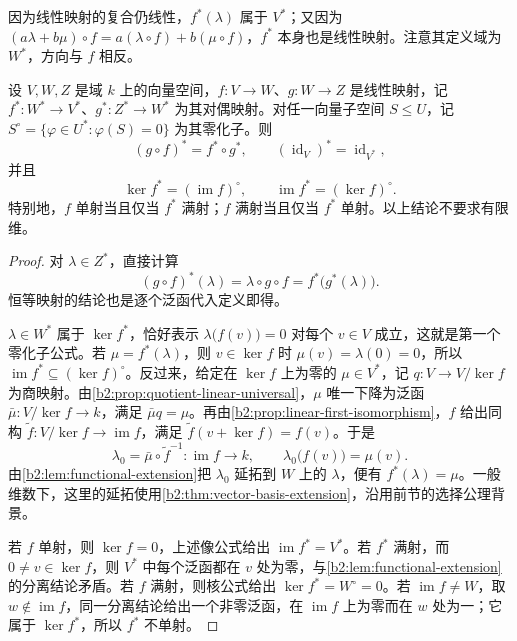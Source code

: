 因为线性映射的复合仍线性，\(f^*(\lambda)\) 属于 \(V^*\)；又因为 \((a\lambda+b\mu)\circ f=a(\lambda\circ f)+b(\mu\circ f)\)，\(f^*\) 本身也是线性映射。注意其定义域为 \(W^*\)，方向与 \(f\) 相反。

\begin{proposition}\label{b2:prop:dual-map}
	设 \(V,W,Z\) 是域 \(k\) 上的向量空间，\(f:V\to W\)、\(g:W\to Z\) 是线性映射，记 \(f^*:W^*\to V^*\)、\(g^*:Z^*\to W^*\) 为其对偶映射。对任一向量子空间 \(S\le U\)，记 \(S^\circ=\{\varphi\in U^*:\varphi(S)=0\}\) 为其零化子。则
	\[
		(g\circ f)^*=f^*\circ g^*,\qquad (\operatorname{id}_V)^*=\operatorname{id}_{V^*},
	\]
	并且
	\begin{equation}\label{b2:eq:dual-kernel-image}
		\ker f^*=(\operatorname{im}f)^\circ, \qquad \operatorname{im}f^*=(\ker f)^\circ.
	\end{equation}
	特别地，\(f\) 单射当且仅当 \(f^*\) 满射；\(f\) 满射当且仅当 \(f^*\) 单射。以上结论不要求有限维。
\end{proposition}

\begin{proof}
	对 \(\lambda\in Z^*\)，直接计算
	\[
		(g\circ f)^*(\lambda)=\lambda\circ g\circ f =f^*\bigl(g^*(\lambda)\bigr).
	\]
	恒等映射的结论也是逐个泛函代入定义即得。

	\(\lambda\in W^*\) 属于 \(\ker f^*\)，恰好表示 \(\lambda\bigl(f(v)\bigr)=0\) 对每个 \(v\in V\) 成立，这就是第一个零化子公式。若 \(\mu=f^*(\lambda)\)，则 \(v\in\ker f\) 时 \(\mu(v)=\lambda(0)=0\)，所以 \(\operatorname{im}f^*\subseteq(\ker f)^\circ\)。反过来，给定在 \(\ker f\) 上为零的 \(\mu\in V^*\)，记 \(q:V\to V/\ker f\) 为商映射。由\cref{b2:prop:quotient-linear-universal}，\(\mu\) 唯一下降为泛函 \(\bar\mu:V/\ker f\to k\)，满足 \(\bar\mu q=\mu\)。再由\cref{b2:prop:linear-first-isomorphism}，\(f\) 给出同构 \(\widetilde f:V/\ker f\to\operatorname{im}f\)，满足 \(\widetilde f(v+\ker f)=f(v)\)。于是
	\[
		\lambda_0=\bar\mu\circ\widetilde f^{-1}:\operatorname{im}f\longrightarrow k, \qquad \lambda_0\bigl(f(v)\bigr)=\mu(v).
	\]
	由\cref{b2:lem:functional-extension}把 \(\lambda_0\) 延拓到 \(W\) 上的 \(\lambda\)，便有 \(f^*(\lambda)=\mu\)。一般维数下，这里的延拓使用\cref{b2:thm:vector-basis-extension}，沿用前节的选择公理背景。

	若 \(f\) 单射，则 \(\ker f=0\)，上述像公式给出 \(\operatorname{im}f^*=V^*\)。若 \(f^*\) 满射，而 \(0\ne v\in\ker f\)，则 \(V^*\) 中每个泛函都在 \(v\) 处为零，与\cref{b2:lem:functional-extension}的分离结论矛盾。若 \(f\) 满射，则核公式给出 \(\ker f^*=W^\circ=0\)。若 \(\operatorname{im}f\ne W\)，取 \(w\notin\operatorname{im}f\)，同一分离结论给出一个非零泛函，在 \(\operatorname{im}f\) 上为零而在 \(w\) 处为一；它属于 \(\ker f^*\)，所以 \(f^*\) 不单射。
\end{proof}

